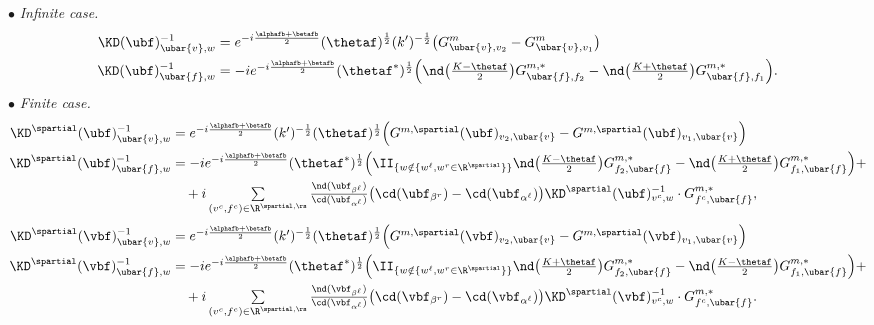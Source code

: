 \documentclass[a4paper,twoside,11pt]{article}
\begin{document}
\begin{exm}
$\bullet$ \emph{Infinite case.}
\begin{align*}\textstyle
\KD(\ubf)^{-1}_{\ubar{v},w}&=e^{-i\frac{\alphafb+\betafb}{2}}\sc(\thetaf)^{\frac{1}{2}}(k')^{-\frac{1}{2}}
\bigl(G^m_{\ubar{v},v_2}-G^m_{\ubar{v},v_1}\bigr)\\
\KD(\ubf)^{-1}_{\ubar{f},w}&\textstyle=-i e^{-i\frac{\alphafb+\betafb}{2}}\sc(\thetaf^*)^{\frac{1}{2}}
\Bigl(\nd\bigl(\frac{K-\thetaf}{2}\bigr)G^{m,*}_{\ubar{f},f_2}-\nd\bigl(\frac{K+\thetaf}{2}\bigr)G^{m,*}_{\ubar{f},f_1} \Bigr).
\end{align*}
$\bullet$ \emph{Finite case.}
\begin{align*}
\KD^\spartial(\ubf)^{-1}_{\ubar{v},w}&\textstyle =e^{-i\frac{\alphafb+\betafb}{2}}(k')^{-\frac{1}{2}}\sc(\thetaf)^{\frac{1}{2}}
\Bigl(G^{m,\spartial}(\ubf)_{v_2,\ubar{v}}-G^{m,\spartial}(\ubf)_{v_1,\ubar{v}}\Bigr)\\
\KD^\spartial(\ubf)^{-1}_{\ubar{f},w}&\textstyle =-ie^{-i\frac{\alphafb+\betafb}{2}}\sc(\thetaf^*)^{\frac{1}{2}}
\Bigl(\II_{\{w\notin\{w^\ell,w^r\in \R^\spartial\}\}}\nd\bigl(\frac{K-\thetaf}{2}\bigr)G^{m,*}_{f_2,\ubar{f}}-
\nd\bigl(\frac{K+\thetaf}{2}\bigr)G^{m,*}_{f_1,\ubar{f}}\Bigl)+\\
&\ \ \  \textstyle+i \sum\limits_{(v^c,f^c)\in\R^{\spartial,\rs}}\frac{\nd(\ubf_{\beta^\ell})}{\cd(\ubf_{\alpha^\ell})}
\bigl(\cd(\ubf_{\beta^r})-\cd(\ubf_{\alpha^\ell})\bigr) \KD^{\spartial}(\ubf)^{-1}_{v^c,w}\cdot G^{m,*}_{f^c,\ubar{f}},
\end{align*}
\begin{align*}
\KD^\spartial(\vbf)^{-1}_{\ubar{v},w}&\textstyle =e^{-i\frac{\alphafb+\betafb}{2}}(k')^{-\frac{1}{2}}\sc(\thetaf)^{\frac{1}{2}}
\Bigl(G^{m,\spartial}(\vbf)_{v_2,\ubar{v}}-G^{m,\spartial}(\vbf)_{v_1,\ubar{v}}\Bigr)\\
\KD^\spartial(\vbf)^{-1}_{\ubar{f},w}&\textstyle =-ie^{-i\frac{\alphafb+\betafb}{2}}\sc(\thetaf^*)^{\frac{1}{2}}
\Bigl(\II_{\{w\notin\{w^\ell,w^r\in \R^\spartial\}\}}\nd\bigl(\frac{K+\thetaf}{2}\bigr)G^{m,*}_{f_2,\ubar{f}}-
\nd\bigl(\frac{K-\thetaf}{2}\bigr)G^{m,*}_{f_1,\ubar{f}}\Bigl)+\\
&\ \ \  \textstyle+i \sum\limits_{(v^c,f^c)\in\R^{\spartial,\rs}}\frac{\nd(\vbf_{\beta^\ell})}{\cd(\vbf_{\alpha^\ell})}
\bigl(\cd(\vbf_{\beta^r})-\cd(\vbf_{\alpha^\ell})\bigr) \KD^{\spartial}(\vbf)^{-1}_{v^c,w}\cdot G^{m,*}_{f^c,\ubar{f}}.
\end{align*}

\end{exm}
\end{document}
